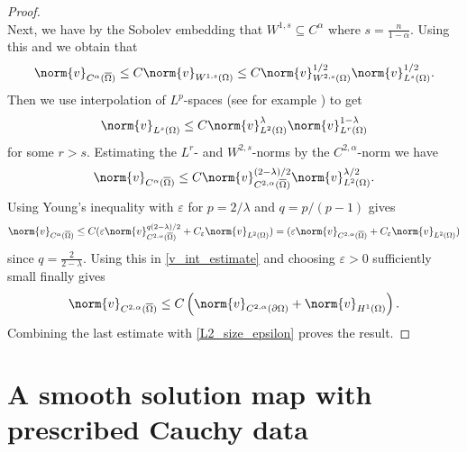 \documentclass[11pt,a4paper]{amsart}
\theoremstyle{definition}
\numberwithin{equation}{section}
\newcommand{\ol}[1]{\overline{#1}}
\newcommand{\eps}{\varepsilon}
\newcommand{\p}{\partial}
\newcommand{\e}{\varepsilon}
\newcommand{\Om}{\Omega}
\begin{document}
\begin{proof}
\begin{equation}
\end{equation}
Next, we have by the Sobolev embedding \cite[Theorem 4.12 Part 2]{af03} that $W^{1,s} \subseteq C^{\alpha}$ where $s = \frac{n}{1-\alpha}$. Using this and \cite[Theorem $5.2$ $(3)$]{af03} we obtain that 
\begin{equation*}
    \norm{v}_{C^{\alpha}(\ol{\Om})}\leq C \norm{v}_{W^{1,s}(\Om)}\leq C \norm{v}_{W^{2,s}(\Om)}^{1/2}\norm{v}_{L^s(\Om)}^{1/2}.
\end{equation*}
Then we use interpolation of $L^{p}$-spaces (see for example \cite[Appendix B]{Evans}) to get
\begin{equation*}
    \norm{v}_{L^s(\Om)}\leq C \norm{v}_{L^2(\Om)}^{\lambda}\norm{v}_{L^r(\Om)}^{1-\lambda}
\end{equation*}
for some $r > s$. Estimating the $L^r$- and $W^{2,s}$-norms by the $C^{2,\alpha}$-norm we have 
\begin{equation*}
    \norm{v}_{C^{\alpha}(\ol{\Om})}\leq C \norm{v}_{C^{2,\alpha}(\ol{\Om})}^{(2-\lambda)/2}\norm{v}_{L^2(\Om)}^{\lambda/2}.
\end{equation*}
Using Young's inequality with $\e$ for $p = 2/\lambda$ and $q = p/(p-1)$ gives
\begin{equation*}
    \norm{v}_{C^{\alpha}(\ol{\Om})}\leq C (\varepsilon\norm{v}_{C^{2,\alpha}(\ol{\Om})}^{q(2-\lambda)/2} + C_{\varepsilon}\norm{v}_{L^2(\Om)}) = (\varepsilon\norm{v}_{C^{2,\alpha}(\ol{\Om})} + C_{\varepsilon}\norm{v}_{L^2(\Om)})
\end{equation*}
since $q = \frac{2}{2-\lambda}$.
Using this in \eqref{v_int_estimate} and choosing $\eps > 0$ sufficiently small finally gives 
\[
\norm{v}_{C^{2,\alpha}(\ol{\Om})} \leq C\left(\norm{v}_{C^{2,\alpha}(\p\Om)} + \norm{v}_{H^1(\Om)}\right).
\]
Combining the last estimate with \eqref{L2_size_epsilon} proves the result.
\end{proof}

\section{A smooth solution map with prescribed Cauchy data}\label{sec_second_sol_map}
\end{document}
